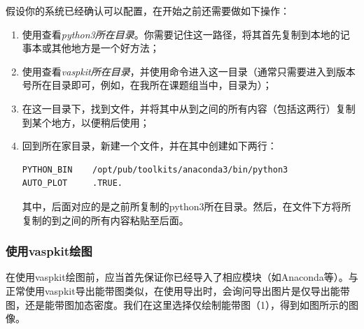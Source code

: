 假设你的系统已经确认可以配置，在开始之前还需要做如下操作：

\begin{enumerate}
    \item 使用查看\emph{python3所在目录}。你需要记住这一路径，将其首先复制到本地的记事本或其他地方是一个好方法；
    \item 使用查看\emph{vaspkit所在目录}，并使用命令进入这一目录（通常只需要进入到版本号所在目录即可，例如，在我所在课题组当中，目录为）；
    \item 在这一目录下，找到文件，并将其中从到之间的所有内容（包括这两行）复制到某个地方，以便稍后使用；
    \item 回到所在家目录，新建一个文件，并在其中创建如下两行：
    \begin{lstlisting}[caption=.vaspkit]
PYTHON_BIN    /opt/pub/toolkits/anaconda3/bin/python3
AUTO_PLOT     .TRUE.
    \end{lstlisting}
    其中，后面对应的是之前所复制的python3所在目录。然后，在文件下方将所复制的到之间的所有内容粘贴至后面。
\end{enumerate}

\subsubsection{使用vaspkit绘图}

在使用vaspkit绘图前，应当首先保证你已经导入了相应模块（如Anaconda等）。与正常使用vaspkit导出能带图类似，在使用导出时，会询问导出图片是仅导出能带图，还是能带图加态密度。我们在这里选择仅绘制能带图（1），得到如图所示的图像。


